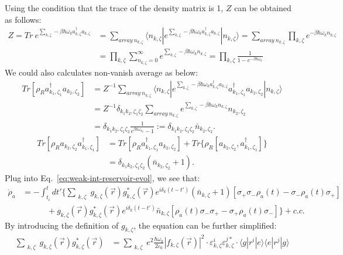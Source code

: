 \documentclass[11pt]{article}
\begin{document}
Using the condition that the trace of the density matrix is 1, $Z$ can be obtained as follows:
\begin{align}
Z = Tr\ e^{\sum_{k,\zeta}-\beta \hbar \omega_k a_{k,\zeta}^\dagger a_{k,\zeta}} &= \sum_{array~n_{k,\zeta} }\langle n_{k,\zeta} |e^{\sum_{k,\zeta}-\beta \hbar \omega_k a_{k,\zeta}^\dagger a_{k,\zeta}} | n_{k,\zeta} \rangle = \sum_{array~n_{k,\zeta} } \prod_{k,\zeta}e^{-\beta \hbar \omega_k n_{k,\zeta}} \\
&=\prod_{k,\zeta}\sum_{n_{k,\zeta}=0 }^{\infty}e^{\sum_{k,\zeta} -\beta \hbar \omega_k n_{k,\zeta}} = \prod_{k,\zeta} \frac{1}{1 -e^{-\beta \hbar \omega_k }  }
\end{align} 
We could also calculates non-vanish average as below:
\begin{align}
Tr[\rho_R a_{k_1,\zeta_1}^\dagger a_{k_2,\zeta_2}] &= Z^{-1}\sum_{array~n_{k,\zeta} }\langle n_{k,\zeta} |e^{\sum_{k,\zeta}-\beta \hbar \omega_k a_{k,\zeta}^\dagger a_{k,\zeta}} a_{k_1,\zeta_1}^\dagger a_{k_2,\zeta_2}| n_{k,\zeta} \rangle \\
&=Z^{-1}  \delta_{k_1k_2,\zeta_1\zeta_2}\sum_{array~n_{k,\zeta} } e^{\sum_{k,\zeta}-\beta \hbar \omega_k n_{k,\zeta}} n_{k_2,\zeta_2} \\
&=\delta_{k_1k_2,\zeta_1\zeta_2} \frac{1}{e^{\beta\hbar\omega_{k_2}} - 1} := \delta_{k_1k_2,\zeta_1\zeta_2} \bar{n}_{k_2,\zeta_2}.
\end{align}
\begin{align}
Tr[\rho_R  a_{k_2,\zeta_2}a_{k_1,\zeta_1}^\dagger] &= Tr[\rho_R  a_{k_1,\zeta_1}^\dagger a_{k_2,\zeta_2}] + Tr\{\rho_R  [a_{k_2,\zeta_2}, a_{k_1,\zeta_1}^\dagger] \} \\
&=\delta_{k_1k_2,\zeta_1\zeta_2}( \bar{n}_{k_2,\zeta_2}+1).
\end{align}
Plug into Eq.~\eqref{eq:weak-int-reservoir-evol}, we see that:
\begin{align}
\dot\rho_{a} &= -\int_{t_i}^t dt'\{\sum_{\substack{k,\zeta}}  g_{k,\zeta} (\vec{r})g^*_{k,\zeta}(\vec{r})e^{i\delta_{k} (t- t')} ( \bar{n}_{k,\zeta}+1) [\sigma_{+}\sigma_{-}\rho_a(t) -\sigma_{-}\rho_a(t)\sigma_{+} ]\\
 &\quad\quad\quad+ g_{k,\zeta} (\vec{r})g^*_{k,\zeta}(\vec{r})e^{i\delta_{k} (t- t')} \bar{n}_{k,\zeta}[\rho_a(t)\sigma_{-}\sigma_{+} -  \sigma_{+}\rho_a(t)\sigma_{-} ]\}+ c.c.
\end{align}
By introducing the definition of $g_{k,\zeta}$, the equation can be further simplified:
\begin{align}
\sum_{\substack{k,\zeta}}  g_{k,\zeta} (\vec{r})g^*_{k,\zeta}(\vec{r}) &= \sum_{\substack{k,\zeta}}e^2 \frac{\hbar \omega_k}{2\varepsilon_0} |f_{k,\zeta}(\vec{r})|^2 \cdot \varepsilon^i_{k,\zeta}\varepsilon^{j*}_{k,\zeta}\cdot \langle g|r^i|e\rangle  \langle e|r^j|g\rangle 
\end{align}
\end{document}
